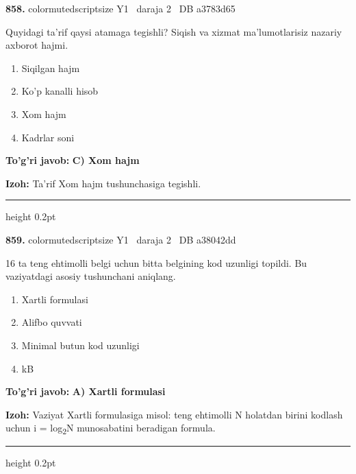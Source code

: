 \documentclass[10pt,a4paper,oneside]{article}
\begin{document}
\noindent\textbf{\color{ink}858.}  {color{muted}scriptsize Y1 \textbullet\ daraja 2 \textbullet\ DB a3783d65}
\par
Quyidagi ta'rif qaysi atamaga tegishli? Siqish va xizmat ma'lumotlarisiz nazariy axborot hajmi.
\begin{enumerate}[label=\Alph*),leftmargin=9mm]
\item Siqilgan hajm
\item Ko'p kanalli hisob
\item Xom hajm
\item Kadrlar soni
\end{enumerate}
\begin{tcolorbox}[enhanced,breakable,colback=teal!4,colframe=teal!50!black,boxrule=0.5pt,arc=1.1mm,left=3mm,right=3mm,top=1.7mm,bottom=1.7mm,before skip=2mm,after skip=2mm]
\textbf{\color{teal}To'g'ri javob:} \textbf{C) Xom hajm}
\par\smallskip
\textbf{Izoh:} Ta'rif Xom hajm tushunchasiga tegishli.
\end{tcolorbox}
\vspace{2mm}\hrule height 0.2pt \vspace{3mm}

\noindent\textbf{\color{ink}859.}  {color{muted}scriptsize Y1 \textbullet\ daraja 2 \textbullet\ DB a38042dd}
\par
16 ta teng ehtimolli belgi uchun bitta belgining kod uzunligi topildi. Bu vaziyatdagi asosiy tushunchani aniqlang.
\begin{enumerate}[label=\Alph*),leftmargin=9mm]
\item Xartli formulasi
\item Alifbo quvvati
\item Minimal butun kod uzunligi
\item kB
\end{enumerate}
\begin{tcolorbox}[enhanced,breakable,colback=teal!4,colframe=teal!50!black,boxrule=0.5pt,arc=1.1mm,left=3mm,right=3mm,top=1.7mm,bottom=1.7mm,before skip=2mm,after skip=2mm]
\textbf{\color{teal}To'g'ri javob:} \textbf{A) Xartli formulasi}
\par\smallskip
\textbf{Izoh:} Vaziyat Xartli formulasiga misol: teng ehtimolli N holatdan birini kodlash uchun i = log\textsubscript{2}N munosabatini beradigan formula.
\end{tcolorbox}
\vspace{2mm}\hrule height 0.2pt \vspace{3mm}
\end{document}

